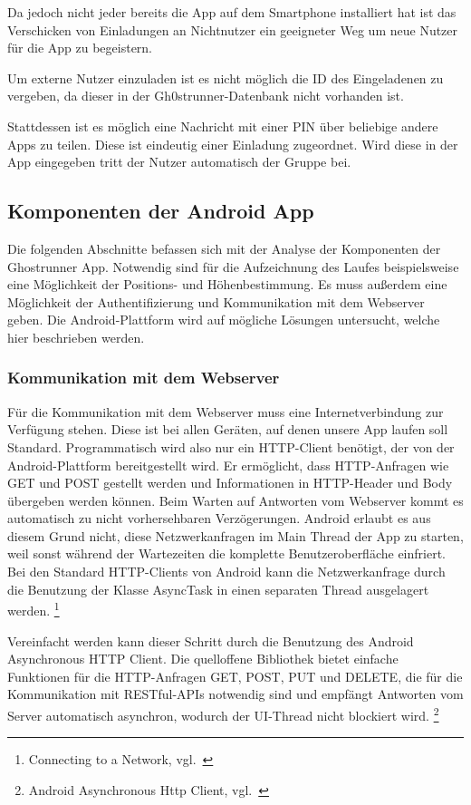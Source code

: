 Da jedoch nicht jeder bereits die App auf dem Smartphone installiert hat ist das Verschicken von Einladungen an Nichtnutzer ein geeigneter Weg um neue Nutzer für die App zu begeistern.

Um externe Nutzer einzuladen ist es nicht möglich die ID des Eingeladenen zu vergeben, da dieser in der Gh0strunner-Datenbank nicht vorhanden ist.

Stattdessen ist es möglich eine Nachricht mit einer PIN über beliebige andere Apps zu teilen. Diese ist eindeutig einer Einladung zugeordnet. Wird diese in der App eingegeben tritt der Nutzer automatisch der Gruppe bei.
\subsection{Komponenten der Android App}
Die folgenden Abschnitte befassen sich mit der Analyse der Komponenten der Ghostrunner App. Notwendig sind für die Aufzeichnung des Laufes beispielsweise eine Möglichkeit der Positions- und Höhenbestimmung. Es muss außerdem eine Möglichkeit der Authentifizierung und Kommunikation mit dem Webserver geben. Die Android-Plattform wird auf mögliche Lösungen untersucht, welche hier beschrieben werden.
\subsubsection{Kommunikation mit dem Webserver}
Für die Kommunikation mit dem Webserver muss eine Internetverbindung zur Verfügung stehen. Diese ist bei allen Geräten, auf denen unsere App laufen soll Standard. Programmatisch wird also nur ein HTTP-Client benötigt, der von der Android-Plattform bereitgestellt wird. Er ermöglicht, dass  HTTP-Anfragen wie GET und POST gestellt werden und Informationen in HTTP-Header und Body übergeben werden können. Beim Warten auf Antworten vom Webserver kommt es automatisch zu nicht vorhersehbaren Verzögerungen. Android erlaubt es aus diesem Grund nicht, diese Netzwerkanfragen im Main Thread der App zu starten, weil sonst während der Wartezeiten die komplette Benutzeroberfläche einfriert. Bei den Standard HTTP-Clients von Android kann die Netzwerkanfrage durch die Benutzung der Klasse AsyncTask in einen separaten Thread ausgelagert werden. \footnote{Connecting to a Network, vgl.~\cite{androidnetwork}}

Vereinfacht werden kann dieser Schritt durch die Benutzung des Android Asynchronous HTTP Client. Die quelloffene Bibliothek bietet einfache Funktionen für die HTTP-Anfragen GET, POST, PUT und DELETE, die für die Kommunikation mit RESTful-APIs notwendig sind und empfängt Antworten vom Server automatisch asynchron, wodurch der UI-Thread nicht blockiert wird. \footnote{Android Asynchronous Http Client, vgl.~\cite{loopj}}
